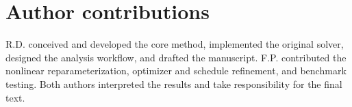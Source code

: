 \section*{Author contributions}
R.D. conceived and developed the core \QeFEM{} method, implemented the
original solver, designed the analysis workflow, and drafted the
manuscript. F.P. contributed the nonlinear reparameterization,
optimizer and schedule refinement, and benchmark testing. Both authors
interpreted the results and take responsibility for the final text.
